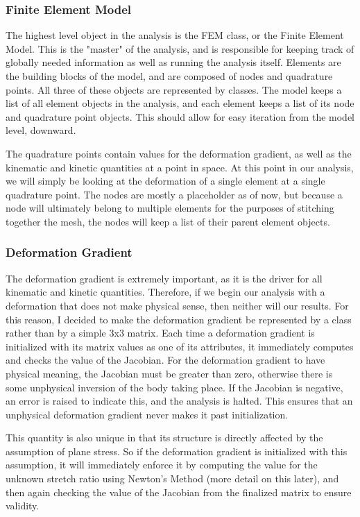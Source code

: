 \documentclass[]{spie}  %
\begin{document}
\subsubsection{Finite Element Model}
The highest level object in the analysis is the FEM class, or the Finite Element Model. This is the "master" of the analysis, and is responsible for keeping track of globally needed information as well as running the analysis itself. Elements are the building blocks of the model, and are composed of nodes and quadrature points. All three of these objects are represented by classes. The model keeps a list of all element objects in the analysis, and each element keeps a list of its node and quadrature point objects. This should allow for easy iteration from the model level, downward. 

The quadrature points contain values for the deformation gradient, as well as the kinematic and kinetic quantities at a point in space. At this point in our analysis, we will simply be looking at the deformation of a single element at a single quadrature point. The nodes are mostly a placeholder as of now, but because a node will ultimately belong to multiple elements for the purposes of stitching together the mesh, the nodes will keep a list of their parent element objects.  

\subsubsection{Deformation Gradient}
The deformation gradient is extremely important, as it is the driver for all kinematic and kinetic quantities. Therefore, if we begin our analysis with a deformation that does not make physical sense, then neither will our results. For this reason, I decided to make the deformation gradient be represented by a class rather than by a simple 3x3 matrix. Each time a deformation gradient is initialized with its matrix values as one of its attributes, it immediately computes and checks the value of the Jacobian. For the deformation gradient to have physical meaning, the Jacobian must be greater than zero, otherwise there is some unphysical inversion of the body taking place. If the Jacobian is negative, an error is raised to indicate this, and the analysis is halted. This ensures that an unphysical deformation gradient never makes it past initialization. 

This quantity is also unique in that its structure is directly affected by the assumption of plane stress. So if the deformation gradient is initialized with this assumption, it will immediately enforce it by computing the value for the unknown stretch ratio using Newton's Method (more detail on this later), and then again checking the value of the Jacobian from the finalized matrix to ensure validity.
\end{document}
